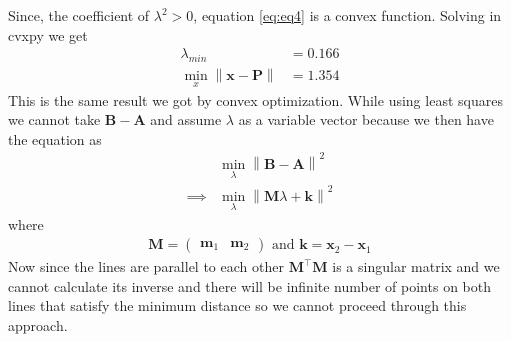 \documentclass[12pt]{article}
\providecommand{\norm}[1]{\left\lVert#1\right\rVert}
\newcommand{\myvec}[1]{\ensuremath{\begin{pmatrix}#1\end{pmatrix}}}
\let\vec\mathbf
\begin{document}
Since, the coefficient of $\lambda^2>0$, equation \eqref{eq:eq4} is a convex function. Solving in cvxpy we get
\begin{align}
	\lambda_{min} &= 0.166\\
	\min_{x}\norm{\vec{x}-\vec{P}} &= 1.354
\end{align}
This is the same result we got by convex optimization. While using least squares we cannot take $\vec{B}-\vec{A}$ and assume $\lambda$ as a variable vector because we then have the equation as
\begin{align}
	&\min_{\lambda}\norm{\vec{B}-\vec{A}}^2\\
	\implies &\min_{\lambda}\norm{\vec{M}\lambda+\vec{k}}^2
\end{align}
where
\begin{align}
	\vec{M} = \myvec{\vec{m}_1 & \vec{m}_2} \text{ and } \vec{k} = \vec{x}_2 - \vec{x}_1
\end{align}
Now since the lines are parallel to each other $\vec{M}^\top\vec{M}$ is a singular matrix and we cannot calculate its inverse and there will be infinite number of points on both lines that satisfy the minimum distance so we cannot proceed through this approach.
\end{document}
